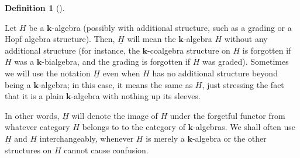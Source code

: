 \documentclass[numbers=enddot,12pt,final,onecolumn,notitlepage,abstracton]{scrartcl}%
\theoremstyle{definition}
\newtheorem{defi}[theo]{Definition}
\newenvironment{definition}[1][]
{\begin{defi}[#1]\begin{leftbar}}
{\end{leftbar}\end{defi}}
\begin{document}
\begin{definition}
\label{def.forget}Let $H$ be a $\mathbf{k}$-algebra (possibly with additional
structure, such as a grading or a Hopf algebra structure). Then,
$\underline{H}$ will mean the $\mathbf{k}$-algebra $H$ without any additional
structure (for instance, the $\mathbf{k}$-coalgebra structure on $H$ is
forgotten if $H$ was a $\mathbf{k}$-bialgebra, and the grading is forgotten if
$H$ was graded). Sometimes we will use the notation $\underline{H}$ even when
$H$ has no additional structure beyond being a $\mathbf{k}$-algebra; in this case, it
means the same as $H$, just stressing the fact that it is a plain $\mathbf{k}%
$-algebra with nothing up its sleeves.

In other words, $\underline{H}$ will denote the image of $H$ under the
forgetful functor from whatever category $H$ belongs to to the category of
$\mathbf{k}$-algebras. We shall often use $\underline{H}$ and $H$
interchangeably, whenever $H$ is merely a $\mathbf{k}$-algebra or the other
structures on $H$ cannot cause confusion.
\end{definition}
\end{document}
